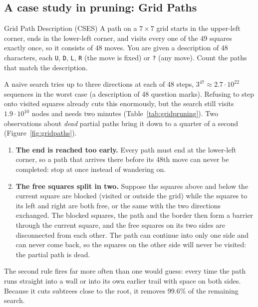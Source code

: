 
\subsection{A case study in pruning: Grid Paths}

\begin{problem}{Grid Path Description (CSES)}
A path on a $7 \times 7$ grid starts in the upper-left corner, ends in the lower-left corner, and visits every one of the 49
squares exactly once, so it consists of 48 moves. You are given a description of 48 characters, each \texttt{U}, \texttt{D},
\texttt{L}, \texttt{R} (the move is fixed) or \texttt{?} (any move). Count the paths that match the description.
\end{problem}

A naive search tries up to three directions at each of 48 steps, $3^{47} \approx 2.7 \cdot 10^{22}$ sequences in the worst
case (a description of 48 question marks). Refusing to step onto visited squares already cuts this enormously, but the
search still visits $1.9 \cdot 10^{10}$ nodes and needs two minutes (Table~\ref{tab:gridpruning}). Two observations about
\emph{dead} partial paths bring it down to a quarter of a second (Figure~\ref{fig:gridpaths}).

\begin{enumerate}
  \item \textbf{The end is reached too early.} Every path must end at the lower-left corner, so a path that arrives there
        before its 48th move can never be completed: stop at once instead of wandering on.
  \item \textbf{The free squares split in two.} Suppose the squares above and below the current square are blocked (visited
        or outside the grid) while the squares to its left and right are both free, or the same with the two directions
        exchanged. The blocked squares, the path and the border then form a barrier through the current square, and the
        free squares on its two sides are disconnected from each other. The path can continue into only one side and can
        never come back, so the squares on the other side will never be visited: the partial path is dead.
\end{enumerate}

The second rule fires far more often than one would guess: every time the path runs straight into a wall or into its own
earlier trail with space on both sides. Because it cuts subtrees close to the root, it removes 99.6\% of the remaining search.

